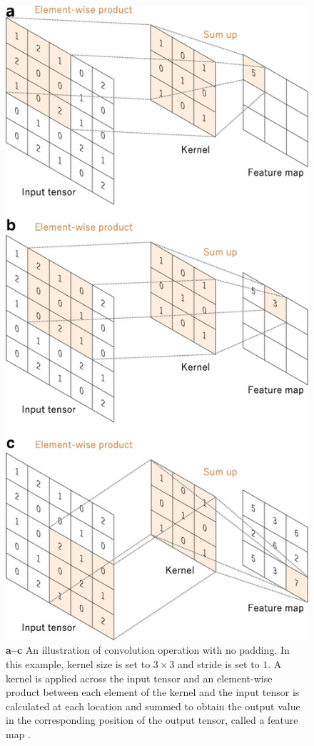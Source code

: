 \begin{figure}[H]
        \begin{center}
	    \includegraphics[scale=0.40]{images/Fundamentals/Convolution.JPG}
	    \caption[An illustration of Convolution Operation.]{\textbf{a–c} An illustration of convolution operation with no padding. In this example, kernel size is set to $3 \times 3$ and stride is set to $1$. A kernel is applied across the input tensor and an element-wise product between each element of the kernel and the input tensor is calculated at each location and summed to obtain the output value in the corresponding position of the output tensor, called a feature map \cite{articleCNNs}.}
	    \label{fig:Convolution}
	    \end{center}
\end{figure}


